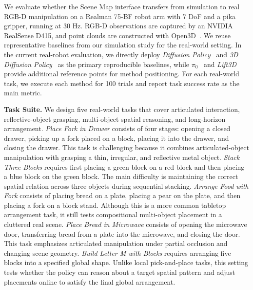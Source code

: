 We evaluate whether the Scene Map interface transfers from simulation to real RGB-D manipulation on a Realman 75-BF robot arm with 7 DoF and a pika gripper, running at 30 Hz. RGB-D observations are captured by an NVIDIA RealSense D415, and point clouds are constructed with Open3D~\cite{Zhou2018Open3D}. We reuse representative baselines from our simulation study for the real-world setting. In the current real-robot evaluation, we directly deploy \textit{Diffusion Policy}~\cite{chi2024diffusionpolicy} and \textit{3D Diffusion Policy}~\cite{Ze2024DP3} as the primary reproducible baselines, while \textit{$\pi_0$}~\cite{black2026pi0visionlanguageactionflowmodel} and \textit{Lift3D}~\cite{Jia_2025_CVPR} provide additional reference points for method positioning. For each real-world task, we execute each method for 100 trials and report task success rate as the main metric.


\textbf{Task Suite.}
We design five real-world tasks that cover articulated interaction, reflective-object grasping, multi-object spatial reasoning, and long-horizon arrangement.
\textit{Place Fork in Drawer} consists of four stages: opening a closed drawer, picking up a fork placed on a block, placing it into the drawer, and closing the drawer. This task is challenging because it combines articulated-object manipulation with grasping a thin, irregular, and reflective metal object.
\textit{Stack Three Blocks} requires first placing a green block on a red block and then placing a blue block on the green block. The main difficulty is maintaining the correct spatial relation across three objects during sequential stacking.
\textit{Arrange Food with Fork} consists of placing bread on a plate, placing a pear on the plate, and then placing a fork on a block stand. Although this is a more common tabletop arrangement task, it still tests compositional multi-object placement in a cluttered real scene.
\textit{Place Bread in Microwave} consists of opening the microwave door, transferring bread from a plate into the microwave, and closing the door. This task emphasizes articulated manipulation under partial occlusion and changing scene geometry.
\textit{Build Letter M with Blocks} requires arranging five blocks into a specified global shape. Unlike local pick-and-place tasks, this setting tests whether the policy can reason about a target spatial pattern and adjust placements online to satisfy the final global arrangement.

